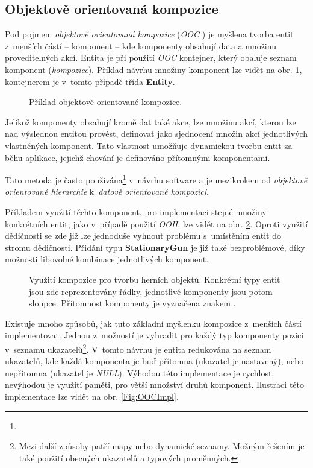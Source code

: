 \subsection{Objektově orientovaná kompozice}

Pod pojmem \emph{objektově orientovaná kompozice} (\emph{OOC} \cite{GameDesignPatterns}) je myšlena tvorba entit z~menších částí -- komponent -- kde komponenty obsahují data a množinu proveditelných akcí. Entita je při použití \emph{OOC} kontejner, který obaluje seznam komponent (\emph{kompozice}). Příklad návrhu množiny komponent lze vidět na obr. \ref{Fig:OOCHierarchy}, kontejnerem je v~tomto případě třída \textbf{Entity}.

\begin{figure}[H]
	\centering
	\caption{Příklad objektově orientované kompozice.}
	\label{Fig:OOCHierarchy}
\end{figure}

Jelikož komponenty obsahují kromě dat také akce, lze množinu akcí, kterou lze nad výslednou entitou provést, definovat jako sjednocení množin akcí jednotlivých vlastněných komponent. Tato vlastnost umožňuje dynamickou tvorbu entit za běhu aplikace, jejichž chování je definováno přítomnými komponentami.

Tato metoda je často používána\footnote{} v~návrhu software a je mezikrokem od \emph{objektově orientované hierarchie} k~\emph{datově orientované kompozici}. 

Příkladem využití těchto komponent, pro implementaci stejné množiny konkrétních entit, jako v~případě použití \emph{OOH}, lze vidět na obr. \ref{Fig:OOCEntity}. Oproti využití dědičnosti se zde již lze jednoduše vyhnout problému s~umístěním entit do stromu dědičnosti. Přidání typu \textbf{StationaryGun} je již také bezproblémové, díky možnosti libovolné kombinace jednotlivých komponent.

\begin{figure}[H]
	\centering
	\caption{Využití kompozice pro tvorbu herních objektů. Konkrétní typy entit jsou zde reprezentovány řádky, jednotlivé komponenty jsou potom sloupce. Přítomnost komponenty je vyznačena znakem .}
	\label{Fig:OOCEntity}
\end{figure}

Existuje mnoho způsobů, jak tuto základní myšlenku kompozice z~menších částí implementovat. Jednou z~možností je vyhradit pro každý typ komponenty pozici v~seznamu ukazatelů\footnote{Mezi další způsoby patří mapy nebo dynamické seznamy. Možným řešením je také použití obecných ukazatelů a typových proměnných. }. V~tomto návrhu je entita redukována na seznam ukazatelů, kde každá komponenta je buď přítomna (ukazatel je nastavený), nebo nepřítomna (ukazatel je \emph{NULL}). Výhodou této implementace je rychlost, nevýhodou je využití paměti, pro větší množství druhů komponent. Ilustraci této implementace lze vidět na obr. \ref{Fig:OOCImpl}. 

